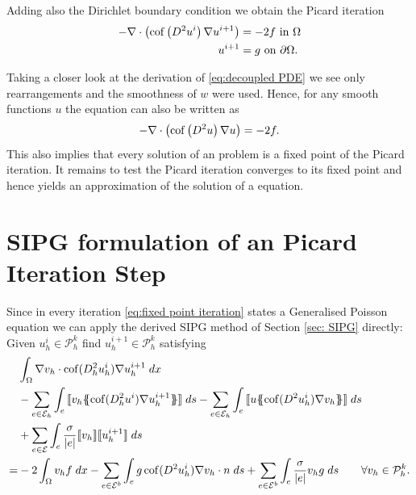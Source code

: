 Adding also the Dirichlet boundary condition we obtain the Picard iteration
\begin{align}
	\begin{split}
	- \nabla \cdot \left( \operatorname{cof} \left(  D^2 u^i \right) \nabla u^{i+1} \right)  &= -2f  \text{ in } \Omega \\
		u^{i+1} &= g \textnormal{ on } \partial \Omega.
	\label{eq:fixed point iteration}
	\end{split}
\end{align}

Taking a closer look at the derivation of \eqref{eq:decoupled PDE} we see only rearrangements and the smoothness of $w$ were used. Hence, for any smooth functions $u$ the \MA equation can also be written as
\begin{align}
- \nabla \cdot \left( \operatorname{cof} \left(  D^2 u \right) \nabla u \right)  = -2f.  \label{eq: analytical fixed point iteration}
\end{align}
This also implies that every solution of an \MA problem is a fixed point of the Picard iteration. It remains to test the Picard iteration converges to its fixed point and hence yields an approximation of the solution of a \MA equation. 


\section{SIPG formulation of an Picard Iteration Step}\label{sec: SIPG MA}
Since in every iteration \eqref{eq:fixed point iteration} states a Generalised Poisson equation we can apply the derived  SIPG method of Section \ref{sec: SIPG} directly: Given $u^i_h\in \mathcal P^k_h$ find $u^{i+1}_h \in \mathcal P^k_h$ satisfying
\begin{align}
 &\myIntX {\Omega} {\nabla v_h \cdot \cof(D_h^2 u_h^{i}) \nabla u_h^{i+1}}  \nonumber\\
 & -\sum\limits_{e \in \edges}\myIntS e { \jump {v_h \average { \cof(D_h^2 u^{i}) \nabla u_h^{i+1}} }}
 - \sum\limits_{e \in \edges}\myIntS e { \jump {u \average{ \cof(D^2 u_h^{i}) \nabla v_h} }} \nonumber\\  
 &  +\sum\limits_{e \in \bigEps} \myIntS e { \frac \sigma {|e|} \jump {v_h}  \jump {u_h^{i+1}}}\nonumber\\
    =& - 2 \myIntX {\Omega} {v_h f}
    	 				-\sum\limits_{e \in \bigEps^b}\myIntS e {g \cof(D^2 u_h^{i}) \nabla v_h \cdot n }
    	 				+\sum\limits_{e \in \bigEps^b} \myIntS e { \frac \sigma {|e|} v_h g}    \qquad \forall v_h \in  \mathcal P^k_h.
    	\label{eq: sipg iteration}
\end{align}


